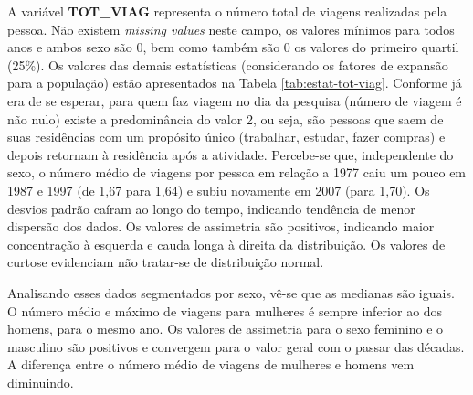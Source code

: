 A variável \textbf{TOT_VIAG} representa o número total de viagens realizadas pela pessoa. Não existem \textit{missing values} neste campo, os valores mínimos para todos anos e ambos sexo são 0, bem como também são 0 os valores do primeiro quartil (25\%). Os valores das demais estatísticas (considerando os fatores de expansão para a população) estão apresentados na Tabela \ref{tab:estat-tot-viag}. Conforme já era de se esperar, para quem faz viagem no dia da pesquisa (número de viagem é não nulo) existe a predominância do valor 2, ou seja, são pessoas que saem de suas residências com um propósito único (trabalhar, estudar, fazer compras) e depois retornam à residência após a atividade.
Percebe-se que, independente do sexo, o número médio de viagens por pessoa em relação a 1977 caiu um pouco em 1987 e 1997 (de 1,67 para 1,64) e subiu novamente em 2007 (para 1,70). Os desvios padrão caíram ao longo do tempo, indicando tendência de menor dispersão dos dados. Os valores de assimetria são positivos, indicando maior concentração à esquerda e cauda longa à direita da distribuição. Os valores de curtose evidenciam não tratar-se de distribuição normal.

Analisando esses dados segmentados por sexo, vê-se que as medianas são iguais. O número médio e máximo de viagens para mulheres é sempre inferior ao dos homens, para o mesmo ano. Os valores de assimetria para o sexo feminino e o masculino são positivos e convergem para o valor geral com o passar das décadas. 
A diferença entre o número médio de viagens de mulheres e homens vem diminuindo.

